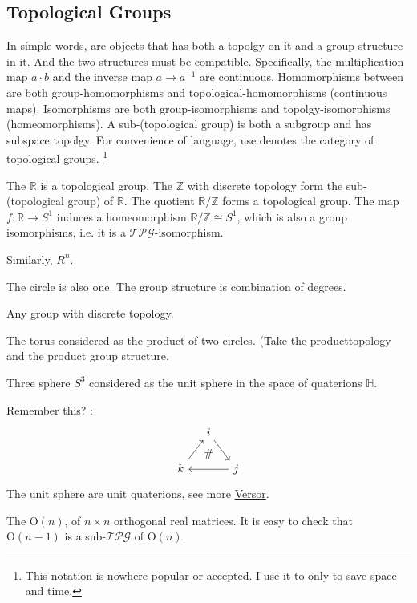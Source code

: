 \documentclass{article}
\begin{document}
\subsection{Topological Groups}
\label{sec:Topological-Groups}

In simple words,  are objects that has both
a topolgy on it and a group structure in it. And the two structures
must be compatible. Specifically, the multiplication map $a\cdot b$
and the inverse map $a\to a^{-1}$ are continuous. Homomorphisms
between are both group-homomorphisms and topological-homomorphisms
(continuous maps). Isomorphisms are both group-isomorphisms and
topolgy-isomorphisms (homeomorphisms). A sub-(topological group) is
both a subgroup and has subspace topolgy. For convenience of language,
use  denotes the category of topological groups.
\footnote{This notation is nowhere popular or accepted. I use it to
only to save space and time.}
\begin{ex}
    The $\mathbb{R}$ is a topological group. 
    The $\mathbb{Z}$ with discrete topology form the sub-(topological
    group) of $\mathbb{R}$. The quotient $\mathbb{R}/\mathbb{Z}$ forms
    a topological group. The map $f: \mathbb{R}\to S^1$ induces a
    homeomorphism $\mathbb{R}/\mathbb{Z} \cong S^1$, which is also a
    group isomorphisms, i.e. it is a $\mathcal{TPG}$-isomorphism.
\end{ex}
\begin{ex}
    Similarly, $R^n$.
\end{ex}

\begin{ex}
    The circle is also one. The group structure is combination of
    degrees.
\end{ex}
\begin{ex}
    Any group with discrete topology.
\end{ex}
\begin{ex}
    The torus considered as the product of two circles. (Take the
    producttopology and the product group structure.
\end{ex}
\begin{ex}
    Three sphere $S^3$ considered as the unit sphere in the space of
    quaterions $\mathbb{H}$.

    Remember this? :
    $$ \begin{tikzcd}[column sep=small]
        & i\ar[dr] &  \, \\
    k \ar[ur] &
    \ar[u,phantom, "\#"] 
    & j\ar[ll]
    \end{tikzcd} $$
    The unit sphere are unit quaterions, see more
    \href{https://en.wikipedia.org/wiki/Versor}{Versor}.
\end{ex}
\begin{ex}
    The  $\mathrm{O}(n)$, of $n\times n$
    orthogonal real matrices. It is easy to check that
    $\mathrm{O}(n-1)$ is a sub-$\mathcal{TPG}$ of $\mathrm{O}(n)$.
\end{ex}
\end{document}
